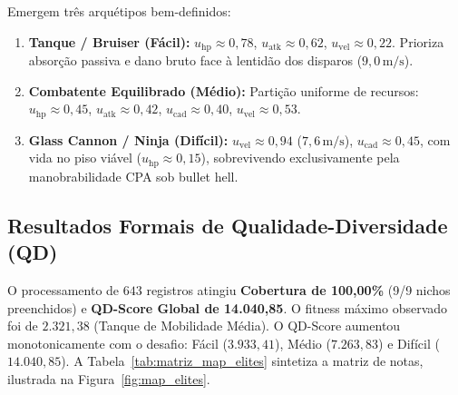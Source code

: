 \documentclass[10pt,conference,twocolumn]{article}
\begin{document}
Emergem três arquétipos bem-definidos:
\begin{enumerate}
    \item \textbf{Tanque / Bruiser (Fácil):} $u_{\text{hp}} \approx 0{,}78$, $u_{\text{atk}} \approx 0{,}62$, $u_{\text{vel}} \approx 0{,}22$. Prioriza absorção passiva e dano bruto face à lentidão dos disparos ($9{,}0\,\text{m/s}$).
    \item \textbf{Combatente Equilibrado (Médio):} Partição uniforme de recursos: $u_{\text{hp}} \approx 0{,}45$, $u_{\text{atk}} \approx 0{,}42$, $u_{\text{cad}} \approx 0{,}40$, $u_{\text{vel}} \approx 0{,}53$.
    \item \textbf{Glass Cannon / Ninja (Difícil):} $u_{\text{vel}} \approx 0{,}94$ ($7{,}6\,\text{m/s}$), $u_{\text{cad}} \approx 0{,}45$, com vida no piso viável ($u_{\text{hp}} \approx 0{,}15$), sobrevivendo exclusivamente pela manobrabilidade CPA sob bullet hell.
\end{enumerate}

\subsection{Resultados Formais de Qualidade-Diversidade (QD)}
O processamento de $643$ registros atingiu \textbf{Cobertura de 100{,}00\%} (9/9 nichos preenchidos) e \textbf{QD-Score Global de 14.040{,}85}. O fitness máximo observado foi de $2.321{,}38$ (Tanque de Mobilidade Média). O QD-Score aumentou monotonicamente com o desafio: Fácil ($3.933{,}41$), Médio ($7.263{,}83$) e Difícil ($14.040{,}85$). A Tabela~\ref{tab:matriz_map_elites} sintetiza a matriz de notas, ilustrada na Figura~\ref{fig:map_elites}.

\begin{table}[h]
\centering
\caption{Matriz de Aptidão Máxima dos Elites no MAP-Elites}
\label{tab:matriz_map_elites}
\end{table}
\end{document}
